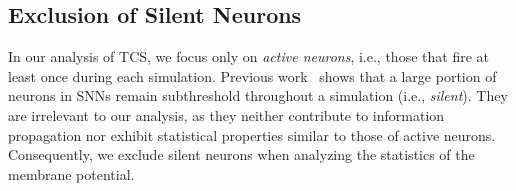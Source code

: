 \subsection{Exclusion of Silent Neurons}
In our analysis of TCS, we focus only on \emph{active neurons}, i.e., those that fire at least once during each simulation. Previous work~\cite{yin:2022} shows that a large portion of neurons in SNNs remain subthreshold throughout a simulation (i.e., \emph{silent}). They are irrelevant to our analysis, as they neither contribute to information propagation nor exhibit statistical properties similar to those of active neurons. Consequently, we exclude silent neurons when analyzing the statistics of the membrane potential.